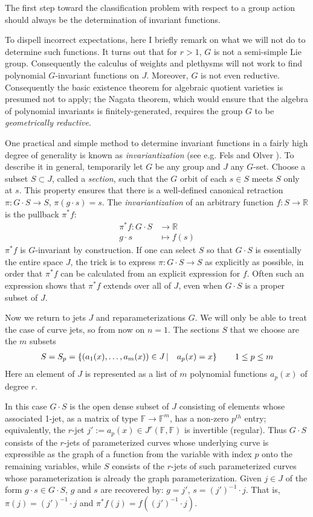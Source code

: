 \documentclass[12pt]{article}
\numberwithin{equation}{section}
\theoremstyle{plain}
\theoremstyle{definition}
\newcommand{\R}{\mathbb{R}}
\newcommand{\ra}{\rightarrow}
\newcommand{\Fb}{\mathbb{F}}
\begin{document}
The first step toward the classification problem with respect to a group action should always be the determination of invariant functions.

To dispell incorrect expectations, here I briefly remark on what we will not do to determine such functions. It turns out that for $r>1$, $G$ is not a semi-simple Lie group. Consequently the calculus of weights and plethysms will not work to find polynomial $G$-invariant functions on $J$. Moreover, $G$ is not even reductive. Consequently the basic existence theorem for algebraic quotient varieties is presumed not to apply; the Nagata theorem, which would ensure that the algebra of polynomial invariants is finitely-generated, requires the group $G$ to be \emph{geometrically reductive}.

One practical and simple method to determine invariant functions in a fairly high degree of generality is known as \emph{invariantization} (see e.g. Fels and Olver \cite{olverfels}). To describe it in general, temporarily let $G$ be any group and $J$ any $G$-set. Choose a subset $S\subset J$, called a \emph{section}, such that the $G$ orbit of each $s\in S$ meets $S$ only at $s$. This property ensures that there is a well-defined canonical retraction $\pi:G\cdot S \ra S$, $\pi(g\cdot s)=s$. The \emph{invariantization} of an arbitrary function $f:S\ra \R$ is the pullback $\pi^{*}f$:
\begin{align*}
\pi^{*}f:G\cdot S&\ra \R\\
g\cdot s &\mapsto f(s)
\end{align*}
$\pi^{*}f$ is $G$-invariant by construction. If one can select $S$ so that $G\cdot S$ is essentially the entire space $J$, the trick is to express $\pi:G\cdot S\ra S$ as explicitly as possible, in order that $\pi^{*}f$ can be calculated from an explicit expression for $f$. Often such an expression shows that $\pi^{*}f$ extends over all of $J$, even when $G\cdot S$ is a proper subset of $J$.

Now we return to jets $J$ and reparameterizations $G$. We will only be able to treat the case of curve jets, so from now on $n=1$. The sections $S$ that we choose are the $m$ subsets 
\begin{align*}
S=S_p=\left\{ (a_1(x),\dots,a_{m}(x))\in J\thinspace| \quad a_{p}(x) = x\right\} \qquad 1\leq p \leq m
\end{align*}
Here an element of $J$ is represented as a list of $m$ polynomial functions $a_p(x)$ of degree $r$.

In this case $G\cdot S$ is the open dense subset of $J$ consisting of elements whose associated 1-jet, as a matrix of type $\Fb\ra \Fb^{m}$, has a non-zero $p^{th}$ entry; equivalently, the $r$-jet $j':=a_{p}(x)\in J^{r}(\Fb,\Fb)$ is invertible (regular). Thus $G\cdot S$ consists of the $r$-jets of parameterized curves whose underlying curve is expressible as the graph of a function from the variable with index $p$ onto the remaining variables, while $S$ consists of the $r$-jets of such parameterized curves whose parameterization is already the graph parameterization. Given $j\in J$ of the form $g\cdot s\in G\cdot S$, $g$ and $s$ are recovered by: $g=j'$, $s=(j')^{-1}\cdot j$. That is, $\pi(j) = (j')^{-1}\cdot j$ and $\pi^{*}f(j)=f((j')^{-1}\cdot j)$.
\end{document}
